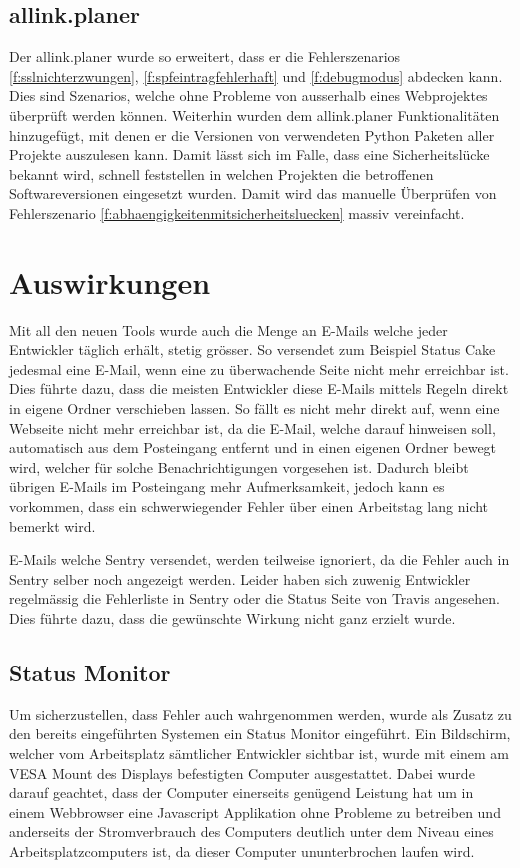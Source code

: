 \subsection{allink.planer}
\label{sub:proof_allink_planer}
Der allink.planer wurde so erweitert, dass er die Fehlerszenarios \ref{f:sslnichterzwungen}, \ref{f:spfeintragfehlerhaft} und \ref{f:debugmodus} abdecken kann. Dies sind Szenarios, welche ohne Probleme von ausserhalb eines Webprojektes überprüft werden können. Weiterhin wurden dem allink.planer Funktionalitäten hinzugefügt, mit denen er die Versionen von verwendeten Python Paketen aller Projekte auszulesen kann. Damit lässt sich im Falle, dass eine Sicherheitslücke bekannt wird, schnell feststellen in welchen Projekten die betroffenen Softwareversionen eingesetzt wurden. Damit wird das manuelle Überprüfen von Fehlerszenario \ref{f:abhaengigkeitenmitsicherheitsluecken} massiv vereinfacht.

\section{Auswirkungen}
\label{sec:auswirkungen}
Mit all den neuen Tools wurde auch die Menge an E-Mails welche jeder Entwickler täglich erhält, stetig grösser. So versendet zum Beispiel Status Cake jedesmal eine E-Mail, wenn eine zu überwachende Seite nicht mehr erreichbar ist. Dies führte dazu, dass die meisten Entwickler diese E-Mails mittels Regeln direkt in eigene Ordner verschieben lassen. So fällt es nicht mehr direkt auf, wenn eine Webseite nicht mehr erreichbar ist, da die E-Mail, welche darauf hinweisen soll, automatisch aus dem Posteingang entfernt und in einen eigenen Ordner bewegt wird, welcher für solche Benachrichtigungen vorgesehen ist. Dadurch bleibt übrigen E-Mails im Posteingang mehr Aufmerksamkeit, jedoch kann es vorkommen, dass ein schwerwiegender Fehler über einen Arbeitstag lang nicht bemerkt wird.

E-Mails welche Sentry versendet, werden teilweise ignoriert, da die Fehler auch in Sentry selber noch angezeigt werden. Leider haben sich zuwenig Entwickler regelmässig die Fehlerliste in Sentry oder die Status Seite von Travis angesehen. Dies führte dazu, dass die gewünschte Wirkung nicht ganz erzielt wurde.

\subsection{Status Monitor}
\label{sub:status_monitor}
Um sicherzustellen, dass Fehler auch wahrgenommen werden, wurde als Zusatz zu den bereits eingeführten Systemen ein Status Monitor eingeführt. Ein Bildschirm, welcher vom Arbeitsplatz sämtlicher Entwickler sichtbar ist, wurde mit einem am VESA Mount des Displays befestigten Computer ausgestattet. Dabei wurde darauf geachtet, dass der Computer einerseits genügend Leistung hat um in einem Webbrowser eine Javascript Applikation ohne Probleme zu betreiben und anderseits der Stromverbrauch des Computers deutlich unter dem Niveau eines Arbeitsplatzcomputers ist, da dieser Computer ununterbrochen laufen wird.

